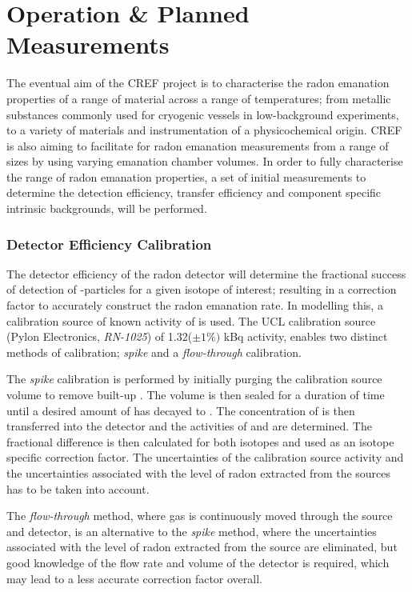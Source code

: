 \section{Operation \&  Planned Measurements}
\label{sec:motivation}

The eventual aim of the CREF project is to characterise the radon emanation properties of a range of material across a range of temperatures; from metallic substances commonly used for cryogenic vessels in low-background experiments, to a variety of materials and instrumentation of a physicochemical origin. CREF is also aiming to facilitate for radon emanation measurements from a range of sizes by using varying emanation chamber volumes. In order to fully characterise the range of radon emanation properties, a set of initial measurements to determine the detection efficiency, transfer efficiency and component specific intrinsic backgrounds, will be performed. 


\subsubsection{Detector Efficiency Calibration}

The detector efficiency of the radon detector will determine the fractional success of detection of \alpha{}-particles for a given isotope of interest; resulting in a correction factor to accurately construct the radon emanation rate. In modelling this, a calibration source of known activity of \RaTTS{} is used. The UCL \RaTTS{} calibration source (Pylon Electronics, \textit{RN-1025}) of 1.32($\pm1\%)$ kBq activity, enables two distinct methods of calibration; \textit{spike} and a \textit{flow-through} calibration. 

The \textit{spike} calibration is performed by initially purging the calibration source volume to remove built-up \RnTTT{}. The volume is then sealed for a duration of time until a desired amount of \RaTTS{} has decayed to \RnTTT{}. The concentration of \RnTTT{} is then transferred into the detector and the activities of \PoTOE{} and \PoTOF{} are determined. The fractional difference is then calculated for both isotopes and used as an isotope specific correction factor. The uncertainties of the calibration source activity and the uncertainties associated with the level of radon extracted from the sources has to be taken into account.

The \textit{flow-through} method, where gas is continuously moved through the source and detector, is an alternative to the \textit{spike} method, where the uncertainties associated with the level of radon extracted from the source are eliminated, but good knowledge of the flow rate and volume of the detector is required, which may lead to a  less accurate correction factor overall. 

